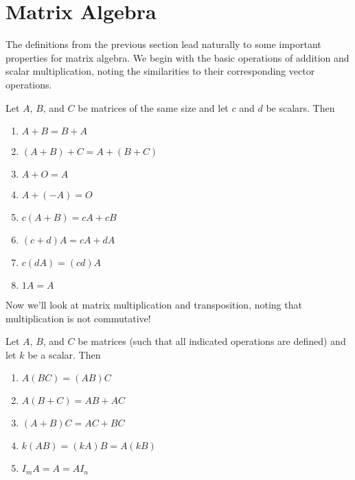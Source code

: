 \documentclass[../m073main.tex]{subfiles}
\begin{document}
\section{Matrix Algebra}
The definitions from the previous section lead naturally to some important properties for matrix algebra.
We begin with the basic operations of addition and scalar multiplication, noting the similarities to their corresponding vector operations.

\begin{theorem}
	Let $A$, $B$, and $C$ be matrices of the same size and let $c$ and $d$ be scalars.
	Then
	\begin{multicols}{2}
		\begin{enumerate}[label=(\alph*)]
			\item $A + B = B + A$
			\item $(A + B) + C = A + (B + C)$
			\item $A + O = A$
			\item $A + (-A) = O$
			\item $c(A + B) = cA + cB$
			\item $(c+d)A = cA + dA$
			\item $c(dA) = (cd)A$
			\item $1A = A$
		\end{enumerate}
	\end{multicols}
\end{theorem}

Now we'll look at matrix multiplication and transposition, noting that multiplication is not commutative!

\begin{theorem}
	Let $A$, $B$, and $C$ be matrices (such that all indicated operations are defined) and let $k$ be a scalar.
	Then
	\begin{multicols}{2}
		\begin{enumerate}[label=(\alph*)]
			\item $A(BC) = (AB)C$
			\item $A(B+C) = AB+AC$
			\item $(A+B)C = AC+BC$
			\item $k(AB) = (kA)B = A(kB)$
			\item $I_mA = A = AI_n$
		\end{enumerate}
	\end{multicols}
\end{theorem}
\end{document}

